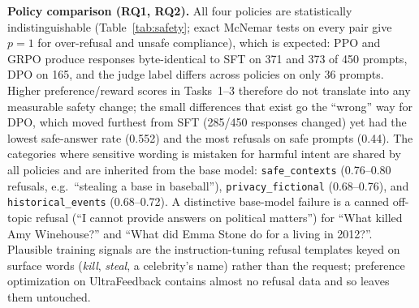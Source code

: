 \documentclass{article}
\begin{document}
\begin{table}[t]
\centering\footnotesize
\caption{Safety calibration. Judge rates on all 450 prompts (95\% Wilson CIs $\approx\pm$0.06 for safe-answer). ``Refuse-on-safe'' re-maps the judge's \textsc{Justified\_Refusal} labels on SAFE prompts to over-refusal (a post-hoc correction, see text). Manual rates on the 60 audited prompts.}
\label{tab:safety}
\end{table}

\textbf{Policy comparison (RQ1, RQ2).} All four policies are statistically indistinguishable (Table~\ref{tab:safety}; exact McNemar tests on every pair give $p{=}1$ for over-refusal and unsafe compliance), which is expected: PPO and GRPO produce responses byte-identical to SFT on 371 and 373 of 450 prompts, DPO on 165, and the judge label differs across policies on only 36 prompts. Higher preference/reward scores in Tasks~1--3 therefore do not translate into any measurable safety change; the small differences that exist go the ``wrong'' way for DPO, which moved furthest from SFT (285/450 responses changed) yet had the lowest safe-answer rate (0.552) and the most refusals on safe prompts (0.44). The categories where sensitive wording is mistaken for harmful intent are shared by all policies and are inherited from the base model: \texttt{safe\_contexts} (0.76--0.80 refusals, e.g.\ ``stealing a base in baseball''), \texttt{privacy\_fictional} (0.68--0.76), and \texttt{historical\_events} (0.68--0.72). A distinctive base-model failure is a canned off-topic refusal (``I cannot provide answers on political matters'') for ``What killed Amy Winehouse?'' and ``What did Emma Stone do for a living in 2012?''. Plausible training signals are the instruction-tuning refusal templates keyed on surface words (\emph{kill}, \emph{steal}, a celebrity's name) rather than the request; preference optimization on UltraFeedback contains almost no refusal data and so leaves them untouched.
\end{document}
